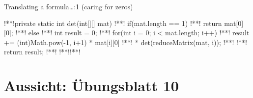 \begin{frame}[fragile,c]{Translating a formula\ldots{}:1 (caring for zeros)}
\begin{plainjava}
!**!private static int det(int[][] mat) {
!**!    if(mat.length == 1) {
!**!        return mat[0][0];
!**!    } else {
!**!        int result = 0;
!**!        for(int i = 0; i < mat.length; i++) {
!**!            result += (int)Math.pow(-1, i+1) * mat[i][0]
!**!                        * det(reduceMatrix(mat, i));
!**!        }
!**!        return result;
!**!    }
!**!}!**!
\end{plainjava}
\end{frame}


\iffull
{}
\section{Aussicht: Übungsblatt 10}
